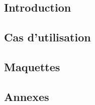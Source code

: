 \documentclass[asi]{picInsa}
\title{\DCP{}}
\author{\Pierre, \Julie{}} %
\begin{document}
\couverture{}

 \informationsGenerales{}


\tableofcontents

\setcounter{chapter}{0}


\chapter*{Introduction}
\label{intro}


\chapter{Cas d'utilisation}
\label{casUtilisation}


\chapter{Maquettes}
\label{maquettes}


\begin{appendix}
\part*{Annexes}
\listoffigures
{}
	 
\listoftables
{}
\end{appendix}
\pageQuatriemeCouverture
\end{document}
